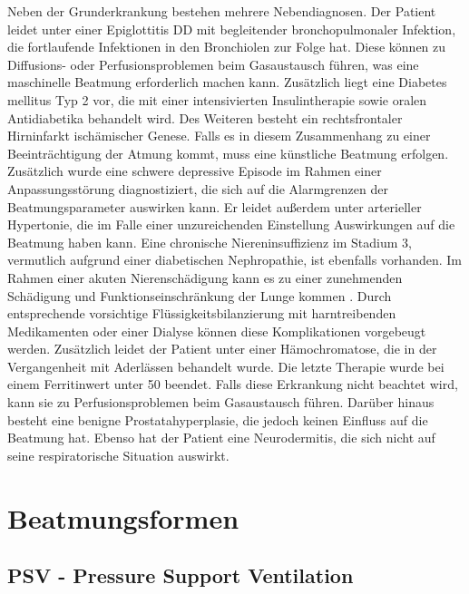 \documentclass[a4paper,12pt]{article}
\begin{document}
Neben der Grunderkrankung bestehen mehrere Nebendiagnosen. Der Patient
leidet unter einer Epiglottitis DD mit begleitender bronchopulmonaler
Infektion, die fortlaufende Infektionen in den Bronchiolen zur Folge hat.
Diese können zu Diffusions- oder Perfusionsproblemen beim Gasaustausch führen,
was eine maschinelle Beatmung erforderlich machen kann. Zusätzlich liegt eine
Diabetes mellitus Typ 2 vor, die mit einer intensivierten Insulintherapie
sowie oralen Antidiabetika behandelt wird.
Des Weiteren besteht ein rechtsfrontaler Hirninfarkt ischämischer Genese.
Falls es in diesem Zusammenhang zu einer Beeinträchtigung der Atmung kommt,
muss eine künstliche Beatmung erfolgen. Zusätzlich wurde eine schwere
depressive Episode im Rahmen einer Anpassungsstörung diagnostiziert,
die sich auf die Alarmgrenzen der Beatmungsparameter auswirken kann.
Er leidet außerdem unter arterieller Hypertonie, die im Falle einer
unzureichenden Einstellung Auswirkungen auf die Beatmung haben kann.
Eine chronische Niereninsuffizienz im Stadium 3, vermutlich aufgrund
einer diabetischen Nephropathie, ist ebenfalls vorhanden.
Im Rahmen einer akuten Nierenschädigung kann es zu einer zunehmenden Schädigung
und Funktionseinschränkung der Lunge kommen \cite{IntensivmedizinWieNieren}.
Durch entsprechende vorsichtige Flüssigkeitsbilanzierung mit harntreibenden Medikamenten
oder einer Dialyse können diese Komplikationen vorgebeugt werden.
Zusätzlich leidet der Patient unter einer Hämochromatose, die in der
Vergangenheit mit Aderlässen behandelt wurde. Die letzte Therapie wurde
bei einem Ferritinwert unter 50 beendet. Falls diese Erkrankung nicht beachtet
wird, kann sie zu Perfusionsproblemen beim Gasaustausch führen. Darüber hinaus
besteht eine benigne Prostatahyperplasie, die jedoch keinen Einfluss auf die
Beatmung hat. Ebenso hat der Patient eine Neurodermitis, die sich nicht auf
seine respiratorische Situation auswirkt.

\section{Beatmungsformen}

\subsection{PSV - Pressure Support Ventilation}
\end{document}
